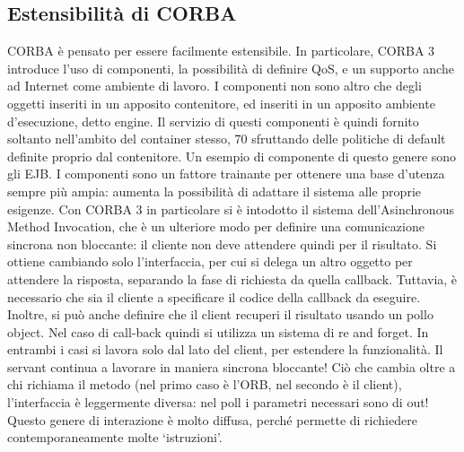 \subsection{Estensibilità di CORBA}
CORBA è pensato per essere facilmente estensibile. In particolare, CORBA
3 introduce l'uso di componenti, la possibilità di definire QoS, e un supporto
anche ad Internet come ambiente di lavoro.
I componenti non sono altro che degli oggetti inseriti in un apposito contenitore, ed inseriti in un apposito ambiente
d'esecuzione, detto engine. Il servizio
di questi componenti è quindi fornito soltanto nell'ambito del container stesso,
70
sfruttando delle politiche di default definite proprio dal contenitore. Un esempio
di componente di questo genere sono gli EJB.
I componenti sono un fattore trainante per ottenere una base d'utenza sempre più ampia: aumenta la possibilità di
adattare il sistema alle proprie esigenze.
Con CORBA 3 in particolare si è intodotto il sistema dell'Asinchronous
Method Invocation, che è un ulteriore modo per definire una comunicazione
sincrona non bloccante: il cliente non deve attendere quindi per il risultato.
Si ottiene cambiando solo l'interfaccia, per cui si delega un altro oggetto per
attendere la risposta, separando la fase di richiesta da quella callback. Tuttavia,
è necessario che sia il cliente a specificare il codice della callback da eseguire.
Inoltre, si può anche definire che il client recuperi il risultato usando un pollo
object. Nel caso di call-back quindi si utilizza un sistema di re and forget. In
entrambi i casi si lavora solo dal lato del client, per estendere la funzionalità.
Il servant continua a lavorare in maniera sincrona bloccante! Ciò che cambia
oltre a chi richiama il metodo (nel primo caso è l'ORB, nel secondo è il client),
l'interfaccia è leggermente diversa: nel poll i parametri necessari sono di out!
Questo genere di interazione è molto diffusa, perché permette di richiedere
contemporaneamente molte {`}istruzioni'.
